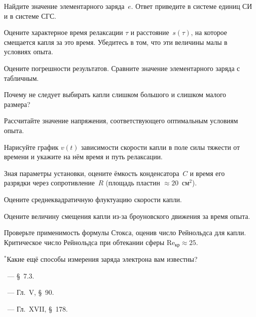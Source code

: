 \begin{lab:task}
\item Найдите значение элементарного заряда~$e$. 
Ответ приведите в системе единиц СИ и в системе СГС.

\item Оцените характерное время релаксации $\tau$ и расстояние~$s(\tau)$, 
на которое смещается капля за это время. Убедитесь в том, что эти величины
малы в условиях опыта.

\item Оцените погрешности результатов. Сравните значение элементарного заряда
с табличным.

\end{lab:task}


\begin{lab:questions}
\item Почему не следует выбирать капли слишком большого и слишком малого
размера?

\item Рассчитайте значение напряжения, соответствующего оптимальным условиям опыта.

\item Нарисуйте график $v(t)$ зависимости скорости капли в поле силы 
тяжести от времени и укажите на нём время и путь релаксации.

\item Зная параметры установки, оцените ёмкость конденсатора~$C$ и время его
разрядки через сопротивление~$R$ (площадь пластин $\approx 20$~см$^2$).

\item Оцените среднеквадратичную флуктуацию скорости капли.

\item Оцените величину смещения капли из-за броуновского движения за время опыта.

\item Проверьте применимость формулы Стокса, оценив число Рейнольдса для капли.
Критическое число Рейнольдса при обтекании сферы $\mathrm{Re}_{кр} \approx 25$.

\item $^*$Какие ещё способы измерения заряда электрона вам известны?
\end{lab:questions}


\begin{lab:literature}
    \item \Kirichenko~--- \S~7.3.
\item \SivuhinIII~--- Гл.~V, \S~90.
\item \Kalashnikov~--- Гл.~XVII, \S~178.
\end{lab:literature}

